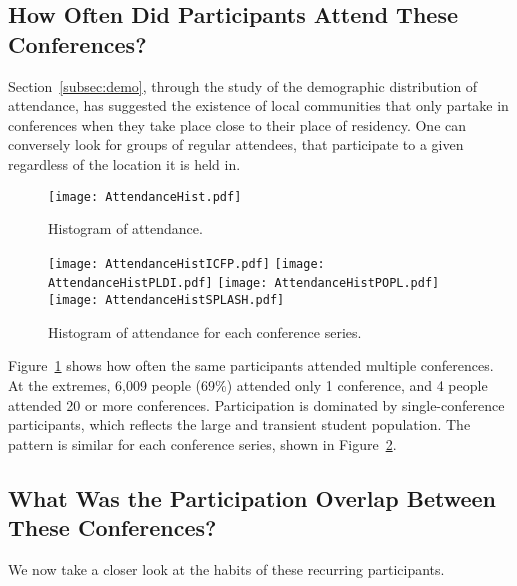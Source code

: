 \subsection{How Often Did Participants Attend These Conferences?}
\label{subsec:overlap}

Section~\ref{subsec:demo}, through the study of the demographic distribution of
attendance, has suggested the existence of local communities that only
partake in conferences when they take place close to their place of residency.
One can conversely look for groups of regular attendees, that participate to a given \conf
regardless of the location it is held in.

\begin{figure}
  \centering
  \texttt{[image: AttendanceHist.pdf]}
  \caption{Histogram of attendance.}
  \label{fig:hist_attendance}
\end{figure}

\begin{figure}
  \centering
  \texttt{[image: AttendanceHistICFP.pdf]}
  \texttt{[image: AttendanceHistPLDI.pdf]}
  \texttt{[image: AttendanceHistPOPL.pdf]}
  \texttt{[image: AttendanceHistSPLASH.pdf]}
  \caption{Histogram of attendance for each conference series.}
  \label{fig:hist_attendance_per_conference}
\end{figure}

Figure~\ref{fig:hist_attendance} shows how often the same participants attended
multiple conferences. At the extremes, 6,009 people (69\%) attended only 1
conference, and 4 people attended 20 or more conferences. Participation is
dominated by single-conference participants, which reflects the large and
transient student population. The pattern is similar for each conference series,
shown in Figure~\ref{fig:hist_attendance_per_conference}.


\subsection{What Was the Participation Overlap Between These Conferences?}

We now take a closer look at the habits of these recurring participants.

